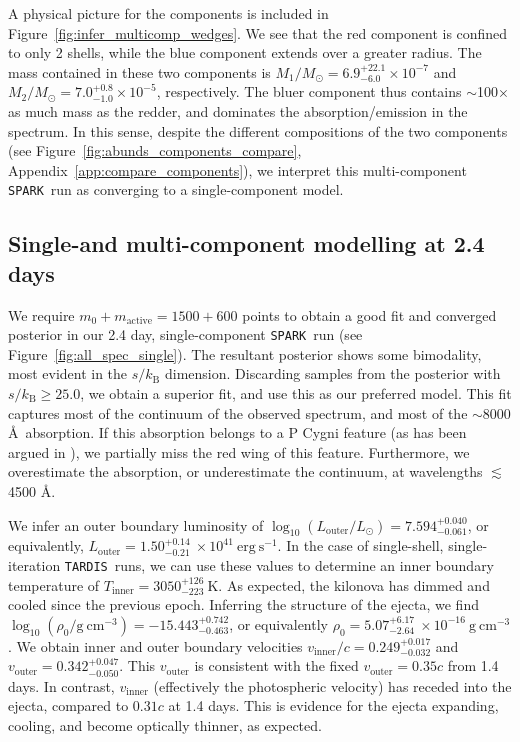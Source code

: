 \documentclass[twocolumn,twocolappendix]{aastex63}
\def\SPARK{\texttt{SPARK}}
\def\TARDIS{\texttt{TARDIS}}
\begin{document}
A physical picture for the components is included in Figure~\ref{fig:infer_multicomp_wedges}. We see that the red component is confined to only 2 shells, while the blue component extends over a greater radius. The mass contained in these two components is $M_1/M_{\odot} = 6.9^{+22.1}_{-6.0} \times 10^{-7}$ and $M_2/M_{\odot} = 7.0^{+0.8}_{-1.0} \times 10^{-5}$, respectively. The bluer component thus contains $\sim$100$\times$ as much mass as the redder, and dominates the absorption/emission in the spectrum. In this sense, despite the different compositions of the two components (see Figure~\ref{fig:abunds_components_compare}, Appendix~\ref{app:compare_components}), we interpret this multi-component \SPARK~run as converging to a single-component model.




\subsection{Single-and multi-component modelling at 2.4 days}\label{ssc:2.4}

We require $m_0 + m_{\mathrm{active}} = 1500 + 600$ points to obtain a good fit and converged posterior in our 2.4 day, single-component \SPARK~run (see Figure~\ref{fig:all_spec_single}). The resultant posterior shows some bimodality, most evident in the $s/k_{\mathrm{B}}$ dimension. Discarding samples from the posterior with $s/k_{\mathrm{B}} \geqslant 25.0$, we obtain a superior fit, and use this as our preferred model. This fit captures most of the continuum of the observed spectrum, and most of the $\sim$8000 \AA~absorption. If this absorption belongs to a P Cygni feature (as has been argued in \citealt{watson19, sneppen23}), we partially miss the red wing of this feature. Furthermore, we overestimate the absorption, or underestimate the continuum, at wavelengths $\lesssim$4500 \AA. 

We infer an outer boundary luminosity of $\log_{10} (L_{\mathrm{outer}}/L_{\odot}) = 7.594^{+0.040}_{-0.061}$, or equivalently, $L_{\mathrm{outer}} = 1.50^{+0.14}_{-0.21}~\times 10^{41}~\mathrm{erg~s^{-1}}$. In the case of single-shell, single-iteration \TARDIS~runs, we can use these values to determine an inner boundary temperature of $T_{\mathrm{inner}} = 3050^{+126}_{-223}~\mathrm{K}$. As expected, the kilonova has dimmed and cooled since the previous epoch. Inferring the structure of the ejecta, we find $\log_{10} (\rho_0 / \mathrm{g~cm^{-3}}) = -15.443^{+0.742}_{-0.463}$, or equivalently $\rho_0 = 5.07^{+6.17}_{-2.64}~\times 10^{-16}~\mathrm{g~cm^{-3}}$. We obtain inner and outer boundary velocities $v_{\mathrm{inner}}/c = 0.249^{+0.017}_{-0.032}$ and $v_{\mathrm{outer}} = 0.342^{+0.047}_{-0.050}$. This $v_{\mathrm{outer}}$ is consistent with the fixed $v_{\mathrm{outer}} = 0.35c$ from 1.4 days. In contrast, $v_{\mathrm{inner}}$ (effectively the photospheric velocity) has receded into the ejecta, compared to $0.31c$ at 1.4 days. This is evidence for the ejecta expanding, cooling, and become optically thinner, as expected.  
\end{document}
